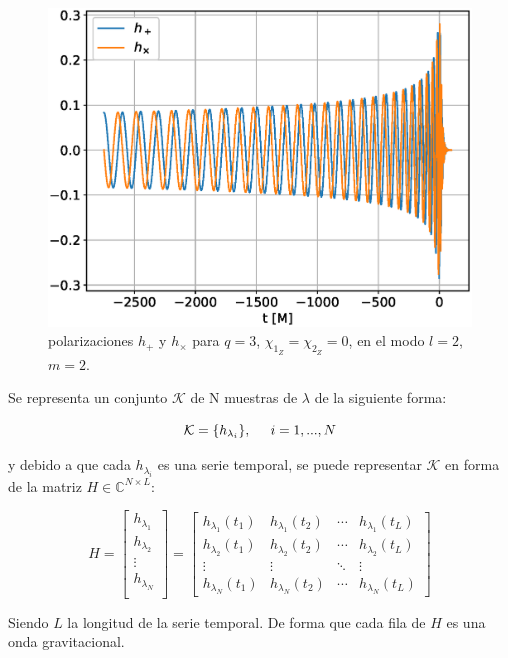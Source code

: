 \begin{figure}[h]
\centering
\includegraphics[width=.9\columnwidth]{figs/h_l2m2_q3.eps}
\caption{polarizaciones \(h_+\) y \(h_{\times}\) para $q = 3$, $\chi_{1_Z} = \chi_{2_Z} = 0$, en el modo $l=2$, $m=2$.}
\label{fig:h_q3}
\end{figure}



Se representa un conjunto \( \mathcal{K} \) de N muestras de $\lambda$ de la siguiente forma:

\[ \mathcal{K}  = \{h_{\lambda_i}\}, \hspace{5mm} i = 1, ..., N\]

y debido a que cada $h_{\lambda_i}$ es una serie temporal, se puede representar $\mathcal{K}$ en forma de la matriz $H \in \mathbb{C}^{N\times L}$:

\[
H = 
\begin{bmatrix}
h_{\lambda_1} \\
h_{\lambda_2} \\
 \vdots \\
 h_{\lambda_N} \\
\end{bmatrix}
= 
\begin{bmatrix}
h_{\lambda_1}(t_1) & h_{\lambda_1}(t_2)  & \cdots & h_{\lambda_1}(t_L)\\
 h_{\lambda_2}(t_1) & h_{\lambda_2}(t_2)  & \cdots & h_{\lambda_2}(t_L)\\
 \vdots & \vdots & \ddots &  \vdots \\
h_{\lambda_N}(t_1) & h_{\lambda_N}(t_2)  & \cdots & h_{\lambda_N}(t_L)
\end{bmatrix}
\]

Siendo $L$ la longitud de la serie temporal. De forma que cada fila de $H$ es una onda gravitacional.


